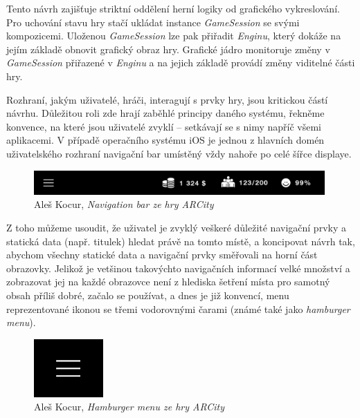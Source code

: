 \documentclass[twoside,12pt]{article}
\begin{document}
Tento návrh zajišťuje striktní oddělení herní logiky od grafického vykreslování. Pro uchování stavu hry stačí ukládat instance \textit{GameSession} se svými kompozicemi. Uloženou \textit{GameSession} lze pak přiřadit \textit{Enginu}, který dokáže na jejím základě obnovit grafický obraz hry. Grafické jádro monitoruje změny v \textit{GameSession} přiřazené v \textit{Enginu} a na jejich základě provádí změny viditelné části hry. 


Rozhraní, jakým uživatelé, hráči, interagují s prvky hry, jsou kritickou částí návrhu. Důležitou roli zde hrají zaběhlé principy daného systému, řekněme konvence, na které jsou uživatelé zvyklí -- setkávají se s nimy napříč všemi aplikacemi. V případě operačního systému iOS je jednou z hlavních domén uživatelského rozhraní navigační bar umístěný vždy nahoře po celé šířce displaye.    

\begin{figure}[H]
\centering
    \includegraphics[width=420px, center]{images/nav_bar_iphone.png}
\captionsetup{justification=centering}
    \caption{Aleš Kocur, \textit{Navigation bar ze hry ARCity}}
    \label{navigation_bar}
\end{figure}

Z toho můžeme usoudit, že uživatel je zvyklý veškeré důležité navigační prvky a statická data (např. titulek) hledat právě na tomto místě, a koncipovat návrh tak, abychom všechny statické data a navigační prvky směřovali na horní část obrazovky. Jelikož je vetšinou takovýchto navigačních informací velké množství a zobrazovat jej na každé obrazovce není z hlediska šetření místa pro samotný obsah příliš dobré, začalo se používat, a dnes je již konvencí, menu reprezentované ikonou se třemi vodorovnými čarami (známé také jako \textit{hamburger menu}). 

\begin{figure}[H]
\centering
    \includegraphics[width=100px, center]{images/hamburger_menu.png}
\captionsetup{justification=centering}
    \caption{Aleš Kocur, \textit{Hamburger menu ze hry ARCity}}
    \label{hamburger-menu}
\end{figure}
\end{document}
